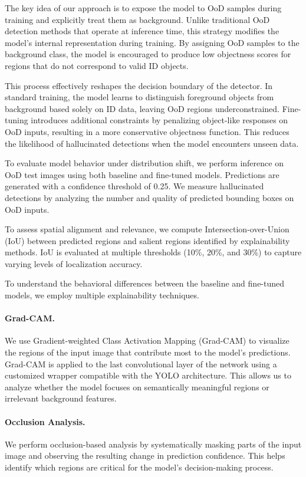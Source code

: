 The key idea of our approach is to expose the model to OoD samples during training and explicitly treat them as background. Unlike traditional OoD detection methods that operate at inference time, this strategy modifies the model's internal representation during training. By assigning OoD samples to the background class, the model is encouraged to produce low objectness scores for regions that do not correspond to valid ID objects.

This process effectively reshapes the decision boundary of the detector. In standard training, the model learns to distinguish foreground objects from background based solely on ID data, leaving OoD regions underconstrained. Fine-tuning introduces additional constraints by penalizing object-like responses on OoD inputs, resulting in a more conservative objectness function. This reduces the likelihood of hallucinated detections when the model encounters unseen data.

To evaluate model behavior under distribution shift, we perform inference on OoD test images using both baseline and fine-tuned models. Predictions are generated with a confidence threshold of 0.25. We measure hallucinated detections by analyzing the number and quality of predicted bounding boxes on OoD inputs.

To assess spatial alignment and relevance, we compute Intersection-over-Union (IoU) between predicted regions and salient regions identified by explainability methods. IoU is evaluated at multiple thresholds (10\%, 20\%, and 30\%) to capture varying levels of localization accuracy.

To understand the behavioral differences between the baseline and fine-tuned models, we employ multiple explainability techniques.

\paragraph{Grad-CAM.}
We use Gradient-weighted Class Activation Mapping (Grad-CAM) to visualize the regions of the input image that contribute most to the model's predictions. Grad-CAM is applied to the last convolutional layer of the network using a customized wrapper compatible with the YOLO architecture. This allows us to analyze whether the model focuses on semantically meaningful regions or irrelevant background features.

\paragraph{Occlusion Analysis.}
We perform occlusion-based analysis by systematically masking parts of the input image and observing the resulting change in prediction confidence. This helps identify which regions are critical for the model's decision-making process.

